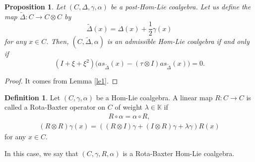 \documentclass{article}
\newtheorem{prop}[thm]{Proposition}
\theoremstyle{definition}
\newtheorem{defn}[thm]{Definition}
\theoremstyle{remark}
\numberwithin{equation}{section}
\begin{document}
\begin{prop}
 Let $(C, \Delta, \gamma, \alpha)$ be a post-Hom-Lie coalgebra. Let us define the map $\tilde\Delta : C\rightarrow C\otimes C$ by
$$\tilde\Delta(x)=\Delta(x)+\frac{1}{2}\gamma(x)$$
for any $x\in C$. Then, $(C, \tilde\Delta, \alpha)$ is an admissible Hom-Lie coalgebra if and only if
$$(I+\xi+\xi^2)\Big(as_{\tilde\Delta}(x)-(\tau\otimes I)as_{\tilde\Delta}(x)\Big)=0.$$
\end{prop}
\begin{proof}
 It comes from Lemma \ref{le1}.
\end{proof}

\begin{defn}
 Let $(C, \gamma, \alpha)$ be a Hom-Lie coalgebra. A linear map $R : C\rightarrow C$ is called a Rota-Baxter operator on $C$ of weight $\lambda\in\mathbb{K}$
if 
\begin{eqnarray}
    R\circ\alpha=\alpha\circ R,
\end{eqnarray}
\begin{eqnarray}
 (R\otimes R)\gamma(x)=((R\otimes I)\gamma+(I\otimes R)\gamma+\lambda\gamma)R(x)
\end{eqnarray}
for any $x\in C$.
\end{defn}
In this case, we say that $(C, \gamma, R, \alpha)$ is a Rota-Baxter Hom-Lie coalgebra.
\end{document}
